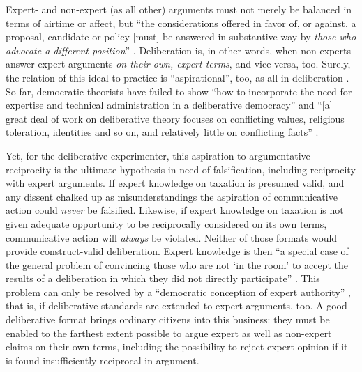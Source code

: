 Expert- and non-expert (as all other) arguments must not merely be balanced in terms of airtime or affect, but ``the considerations offered in favor of, or against, a proposal, candidate or policy [must] be answered in substantive way by \emph{those who advocate a different position}'' \citep[K550, emphasis added]{Fishkin2009}.
Deliberation is, in other words, when non-experts answer expert arguments \emph{on their own, expert terms}, and vice versa, too.
Surely, the relation of this ideal to practice is ``aspirational'', too, as all in deliberation \citep[K2679]{Fishkin2009}. 
So far, democratic theorists have failed to show ``how to incorporate the need for expertise and technical administration in a deliberative democracy'' \citep[515]{Thompson2008} and ``[a] great deal of work on deliberative theory focuses on conflicting values, religious toleration, identities and so on, and relatively little on conflicting facts'' \citep[2]{Moore2011}.

Yet, for the deliberative experimenter, this aspiration to argumentative reciprocity is the ultimate hypothesis in need of  falsification, including reciprocity with expert arguments.
If expert knowledge on taxation is presumed valid, and any dissent chalked up as misunderstandings the aspiration of communicative action could \emph{never} be falsified.
Likewise, if expert knowledge on taxation is not given adequate opportunity to be reciprocally considered on its own terms, communicative action will \emph{always} be violated.
Neither of those formats would provide construct-valid deliberation.
Expert knowledge is then ``a special case of the general problem of convincing those who are not `in the room' to accept the results of a deliberation in which they did not directly participate'' \citep[2]{Moore2011}.
This problem can only be resolved by a ``democratic conception of expert authority'' \cite[2]{Moore2011}, that is, if deliberative standards are extended to expert arguments, too.
A good deliberative format brings ordinary citizens into this business: they must be enabled to the farthest extent possible to argue expert as well as non-expert claims on their own terms, including the possibility to reject expert opinion if it is found insufficiently reciprocal in argument.

